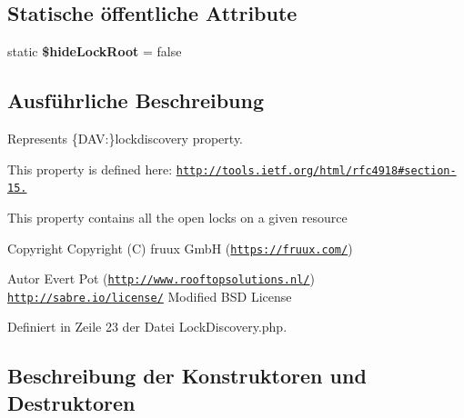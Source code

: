 \subsection*{Statische öffentliche Attribute}
\begin{DoxyCompactItemize}
\item 
\mbox{\label{class_sabre_1_1_d_a_v_1_1_xml_1_1_property_1_1_lock_discovery_a5f73a08f8069945580a0888f4bb829e9}} 
static {\bfseries \$hide\+Lock\+Root} = false
\end{DoxyCompactItemize}


\subsection{Ausführliche Beschreibung}
Represents \{D\+AV\+:\}lockdiscovery property.

This property is defined here\+: \href{http://tools.ietf.org/html/rfc4918#section-15.8}{\tt http\+://tools.\+ietf.\+org/html/rfc4918\#section-\/15.}

This property contains all the open locks on a given resource

\begin{DoxyCopyright}{Copyright}
Copyright (C) fruux GmbH (\href{https://fruux.com/}{\tt https\+://fruux.\+com/}) 
\end{DoxyCopyright}
\begin{DoxyAuthor}{Autor}
Evert Pot (\href{http://www.rooftopsolutions.nl/}{\tt http\+://www.\+rooftopsolutions.\+nl/})  \href{http://sabre.io/license/}{\tt http\+://sabre.\+io/license/} Modified B\+SD License 
\end{DoxyAuthor}


Definiert in Zeile 23 der Datei Lock\+Discovery.\+php.



\subsection{Beschreibung der Konstruktoren und Destruktoren}
\mbox{\label{class_sabre_1_1_d_a_v_1_1_xml_1_1_property_1_1_lock_discovery_aae6b209df18e7a91fa468059c8b8274d}} 
